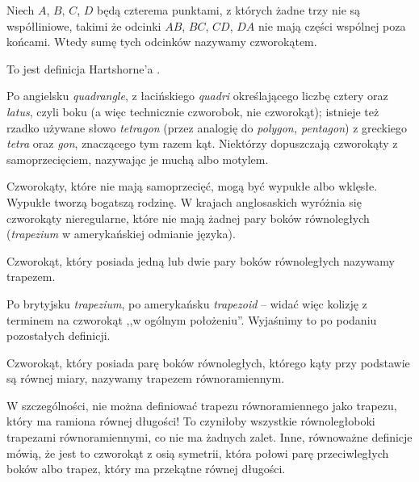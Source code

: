 %

\begin{definition}[czworokąt]
    Niech $A$, $B$, $C$, $D$ będą czterema punktami, z których żadne trzy nie są współliniowe, takimi że odcinki $AB$, $BC$, $CD$, $DA$ nie mają części wspólnej poza końcami.
    Wtedy sumę tych odcinków nazywamy czworokątem.
\end{definition}


To jest definicja Hartshorne'a \cite[s. 80]{hartshorne2000}.

Po angielsku \emph{quadrangle}, z łacińskiego \emph{quadri} określającego liczbę cztery oraz \emph{latus}, czyli boku (a więc technicznie czworobok, nie czworokąt); istnieje też rzadko używane słowo \emph{tetragon} (przez analogię do \emph{polygon, pentagon}) z greckiego \emph{tetra} oraz \emph{gon}, znaczącego tym razem kąt.
Niektórzy dopuszczają czworokąty z samoprzecięciem, nazywając je muchą albo motylem.

Czworokąty, które nie mają samoprzecięć, mogą być wypukłe albo wklęsłe.
Wypukłe tworzą bogatszą rodzinę.
W krajach anglosaskich wyróżnia się czworokąty nieregularne, które nie mają żadnej pary boków równoległych (\emph{trapezium} w amerykańskiej odmianie języka).

\begin{definition}[trapez]
	Czworokąt, który posiada jedną lub dwie pary boków równoległych nazywamy trapezem.
\end{definition}

Po brytyjsku \emph{trapezium}, po amerykańsku \emph{trapezoid} -- widać więc kolizję z terminem na czworokąt ,,w ogólnym położeniu''.
Wyjaśnimy to po podaniu pozostałych definicji. %

\begin{definition}
	Czworokąt, który posiada parę boków równoległych, którego kąty przy podstawie są równej miary, nazywamy trapezem równoramiennym.
\end{definition}

W szczególności, nie można definiować trapezu równoramiennego jako trapezu, który ma ramiona równej długości!
To czyniłoby wszystkie równoległoboki trapezami równoramiennymi, co nie ma żadnych zalet.
%
Inne, równoważne definicje mówią, że jest to czworokąt z osią symetrii, która połowi parę przeciwległych boków albo trapez, który ma przekątne równej długości.

